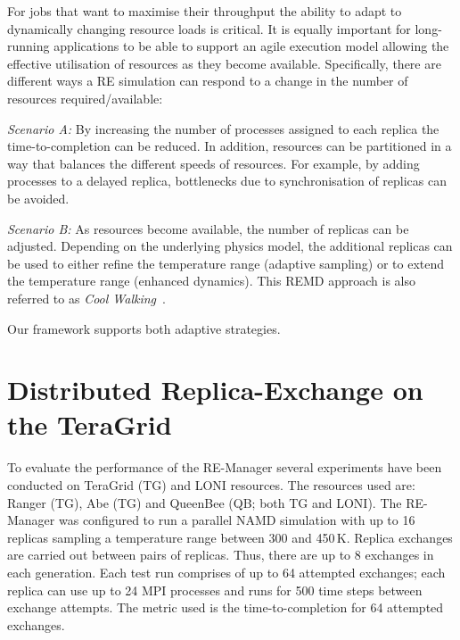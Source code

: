 \documentclass{rspublic}
\begin{document}
For jobs that want to maximise their throughput the ability to adapt
to dynamically changing resource loads is critical. 
It is equally important for long-running applications to be
able to support an agile execution model allowing the effective
utilisation of resources as they become available.  Specifically,
there are different ways a RE simulation can respond to a change in
the number of resources required/available:
\begin{compactitem}         
\item {\it Scenario A:} By increasing the number of processes assigned
  to each replica the time-to-completion can be reduced. In addition,
  resources can be partitioned in a way that balances the different
  speeds of resources.  For example, by adding processes to a 
  delayed replica, bottlenecks due to synchronisation of replicas can
  be avoided.

\item {\it Scenario B:} As resources become available, the
  number of replicas can be adjusted. Depending on the underlying
  physics model, the additional replicas can be used to either refine
  the temperature range (adaptive sampling) or to extend the
  temperature range (enhanced dynamics). This REMD approach is also
  referred to as \emph{Cool Walking}~\citep{coolwalking}.
\end{compactitem}           
Our framework supports both adaptive strategies.


\section{Distributed Replica-Exchange on the TeraGrid}
\label{sec:exp}
        
To evaluate the performance of the RE-Manager several experiments have
been conducted on TeraGrid (TG) and LONI resources. The resources
used are: Ranger (TG), Abe (TG) and QueenBee (QB; both TG and LONI).
The RE-Manager was configured to run a parallel NAMD simulation with up to 16
replicas sampling a temperature range between 300 and 450\,K. Replica
exchanges are carried out between pairs of replicas. Thus,
there are up to 8 exchanges in each generation. Each test run comprises
of up to 64 attempted exchanges; each replica can 
use up to 24 MPI processes and runs for 500 time steps 
between exchange attempts. The metric used 
is the time-to-completion for 64 attempted exchanges.
\end{document}
